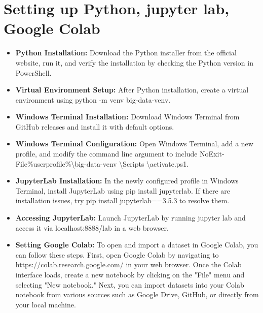 \documentclass{article}
\begin{document}
\section{Setting up Python, jupyter lab, Google Colab }
\begin{itemize}
    \item {\bfseries Python Installation: }Download the Python installer from the official website, run it, and verify the installation by checking the Python version in PowerShell.
    \item {\bfseries Virtual Environment Setup:} After Python installation, create a virtual environment using python -m venv big-data-venv.
    \item {\bfseries Windows Terminal Installation:}  Download Windows Terminal from GitHub releases and install it with default options.
    \item {\bfseries Windows Terminal Configuration:} Open Windows Terminal, add a new profile, and modify the command line argument to include NoExit-File\%userprofile\%\textbackslash big-data-venv \textbackslash Scripts \textbackslash activate.ps1.
    \item {\bfseries JupyterLab Installation:} In the newly configured profile in Windows Terminal, install JupyterLab using pip install jupyterlab. If there are installation issues, try pip install jupyterlab==3.5.3 to resolve them.
    \item {\bfseries Accessing JupyterLab:} Launch JupyterLab by running jupyter lab and access it via localhost:8888/lab in a web browser.
    \item {\bfseries Setting Google Colab:}
    To open and import a dataset in Google Colab, you can follow these steps. First, open Google Colab by navigating to https://colab.research.google.com/ in your web browser. Once the Colab interface loads, create a new notebook by clicking on the "File" menu and selecting "New notebook." Next, you can import datasets into your Colab notebook from various sources such as Google Drive, GitHub, or directly from your local machine. 

\end{itemize}
\end{document}
